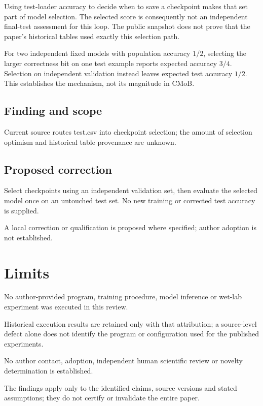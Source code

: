 \documentclass[11pt]{article}
\begin{document}
Using test-loader accuracy to decide when to save a checkpoint makes that set part of model selection. The selected score is consequently not an independent final-test assessment for this loop. The public snapshot does not prove that the paper's historical tables used exactly this selection path.

For two independent fixed models with population accuracy \(1/2\), selecting the larger correctness bit on one test example reports expected accuracy \(3/4\). Selection on independent validation instead leaves expected test accuracy \(1/2\). This establishes the mechanism, not its magnitude in CMoB.

\subsection*{Finding and scope}

Current source routes test.csv into checkpoint selection; the amount of selection optimism and historical table provenance are unknown.

\subsection*{Proposed correction}

Select checkpoints using an independent validation set, then evaluate the selected model once on an untouched test set. No new training or corrected test accuracy is supplied.

A local correction or qualification is proposed where specified; author adoption is not established.

\section*{Limits}

No author-provided program, training procedure, model inference or wet-lab experiment was executed in this review.\par

Historical execution results are retained only with that attribution; a source-level defect alone does not identify the program or configuration used for the published experiments.\par

No author contact, adoption, independent human scientific review or novelty determination is established.\par

The findings apply only to the identified claims, source versions and stated assumptions; they do not certify or invalidate the entire paper.\par
\end{document}
